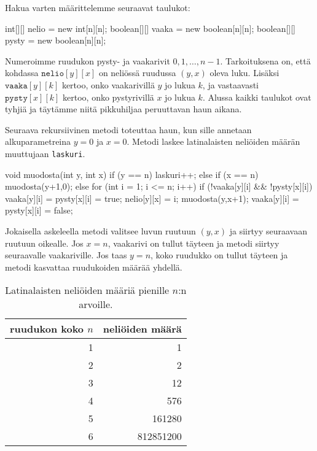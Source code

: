 Hakua varten määrittelemme seuraavat taulukot:

\begin{code}
int[][] nelio = new int[n][n];
boolean[][] vaaka = new boolean[n][n];
boolean[][] pysty = new boolean[n][n];
\end{code}

Numeroimme ruudukon pysty- ja vaakarivit $0,1,\dots,n-1$.
Tarkoituksena on, että kohdassa $\texttt{nelio}[y][x]$
on neliössä ruudussa $(y,x)$ oleva luku.
Lisäksi $\texttt{vaaka}[y][k]$ kertoo, onko vaakarivillä $y$
jo lukua $k$, ja vastaavasti $\texttt{pysty}[x][k]$ kertoo,
onko pystyrivillä $x$ jo lukua $k$.
Alussa kaikki taulukot ovat tyhjiä ja täytämme niitä
pikkuhiljaa peruuttavan haun aikana.

Seuraava rekursiivinen metodi toteuttaa haun, kun sille
annetaan alkuparametreina $y=0$ ja $x=0$.
Metodi laskee latinalaisten neliöiden määrän muuttujaan 
\texttt{laskuri}.

\begin{code}
void muodosta(int y, int x) {
    if (y == n) laskuri++;
    else if (x == n) muodosta(y+1,0);
    else {
        for (int i = 1; i <= n; i++) {
            if (!vaaka[y][i] && !pysty[x][i]) {
                vaaka[y][i] = pysty[x][i] = true;
                nelio[y][x] = i;
                muodosta(y,x+1);
                vaaka[y][i] = pysty[x][i] = false;
            }
        }
    }
}
\end{code}

Jokaisella askeleella metodi valitsee luvun ruutuun
$(y,x)$ ja siirtyy seuraavaan ruutuun oikealle.
Jos $x=n$, vaakarivi on tullut täyteen ja metodi siirtyy
seuraavalle vaakariville.
Jos taas $y=n$, koko ruudukko on tullut täyteen ja
metodi kasvattaa ruudukoiden määrää yhdellä.

\begin{table}
\center
\begin{tabular}{rr}
ruudukon koko $n$ & neliöiden määrä \\
\hline
1 & 1 \\
2 & 2 \\
3 & 12 \\
4 & 576 \\
5 & 161280 \\
6 & 812851200 \\
\end{tabular}
\caption{Latinalaisten neliöiden määriä pienille $n$:n arvoille.}
\label{tab:latnel}
\end{table}

